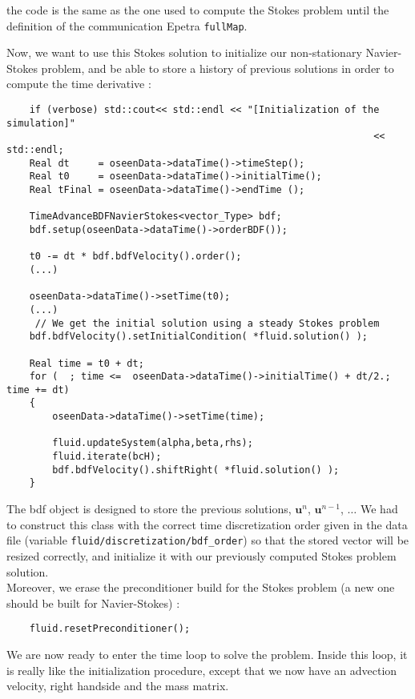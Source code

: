 \noindent the code is the same as the one used to compute the Stokes problem until the definition of the communication Epetra \verb+fullMap+. %

Now, we want to use this Stokes solution to initialize our non-stationary Navier-Stokes problem, and be able
to store a history of previous solutions in order to compute the time derivative :

\begin{verbatim}
    if (verbose) std::cout<< std::endl << "[Initialization of the simulation]" 
                                                                << std::endl;
    Real dt     = oseenData->dataTime()->timeStep();
    Real t0     = oseenData->dataTime()->initialTime();
    Real tFinal = oseenData->dataTime()->endTime ();

    TimeAdvanceBDFNavierStokes<vector_Type> bdf;
    bdf.setup(oseenData->dataTime()->orderBDF());

    t0 -= dt * bdf.bdfVelocity().order();
    (...)

    oseenData->dataTime()->setTime(t0);
    (...)
     // We get the initial solution using a steady Stokes problem
    bdf.bdfVelocity().setInitialCondition( *fluid.solution() );
    
    Real time = t0 + dt;
    for (  ; time <=  oseenData->dataTime()->initialTime() + dt/2.; time += dt)
    {
        oseenData->dataTime()->setTime(time);

        fluid.updateSystem(alpha,beta,rhs);
        fluid.iterate(bcH);
        bdf.bdfVelocity().shiftRight( *fluid.solution() );
    }

\end{verbatim}

\noindent The bdf object is designed to store the previous solutions, $\bm{u}^n$, $\bm{u}^{n-1}$, $\ldots$ We had to construct this class
with the correct time discretization order given in the data file (variable \verb!fluid/discretization/bdf_order!) 
so that the stored vector will be resized correctly, and initialize it with our previously computed Stokes problem solution.\\
Moreover, we erase the preconditioner build for the Stokes problem (a new one should be built for Navier-Stokes) :
\begin{verbatim}
    fluid.resetPreconditioner();
\end{verbatim}

We are now ready to enter the time loop to solve the problem. Inside this loop, it is really like the initialization procedure, except that we now have an advection velocity, right handside and the mass matrix.


